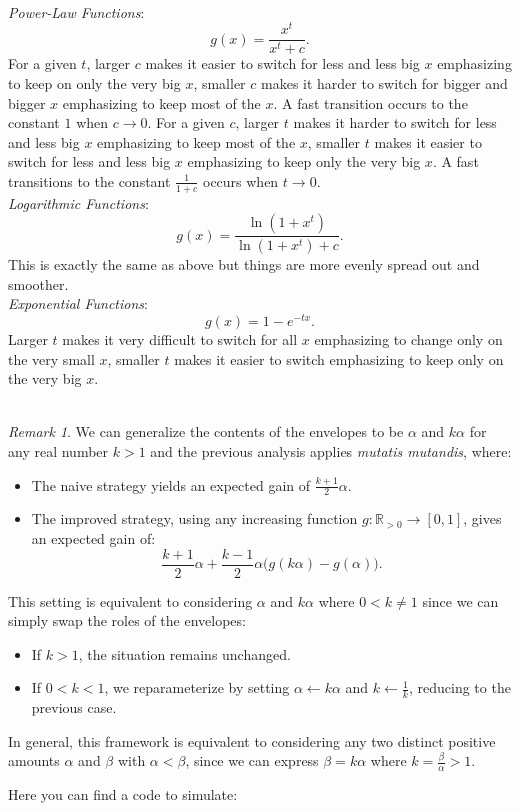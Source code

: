 \documentclass[11pt, a4paper, oneside]{article}
\theoremstyle{remark}
\newtheorem*{remark}{Remark}
\theoremstyle{lemma}
\begin{document}
\\
\textit{Power-Law Functions}:
    \[
    g(x) = \frac{x^t}{x^t + c}.
    \]
For a given $t$, larger \( c \) makes it easier to switch for less and less big \( x\) emphasizing to keep on only the very big $x$, smaller \(c\) makes it harder to switch for bigger and bigger $x$ emphasizing to keep most of the $x$. A fast transition occurs to the constant $1$ when $c\to 0$. For a given $c$, larger $t$ makes it harder to switch for less and less big $x$ emphasizing to keep most of the $x$, smaller $t$ makes it easier to switch for less and less big $x$ emphasizing to keep only the very big $x$. A fast transitions to the constant $\frac{1}{1+c}$ occurs when $t\to 0$. \\
\textit{Logarithmic Functions}:
    \[
    g(x) = \frac{\ln(1 + x^t)}{\ln(1 + x^t) + c}.
    \]
This is exactly the same as above but things are more evenly spread out and smoother. \\
\textit{Exponential Functions}:
    \[
    g(x) = 1 - e^{-t x}.
    \]
Larger \( t \) makes it very difficult to switch for all \( x \) emphasizing to change only on the very small $x$, smaller \(t\) makes it easier to switch emphasizing to keep only on the very big $x$.
\\\\
\begin{remark}
We can generalize the contents of the envelopes to be $\alpha$ and $k\alpha$ for any real number $k > 1$ and the previous analysis applies \textit{mutatis mutandis}, where:
\begin{itemize}
    \item The naive strategy yields an expected gain of $\frac{k+1}{2}\alpha$.
    \item The improved strategy, using any increasing function $g \colon \mathbb{R}_{>0} \to [0,1]$, gives an expected gain of:
    \[
    \frac{k+1}{2}\alpha + \frac{k-1}{2}\alpha\bigl(g(k\alpha) - g(\alpha)\bigr).
    \]
\end{itemize}
This setting is equivalent to considering $\alpha$ and $k\alpha$ where $0 < k \neq 1$ since we can simply swap the roles of the envelopes: 
\begin{itemize}
    \item If $k > 1$, the situation remains unchanged.
    \item If $0 < k < 1$, we reparameterize by setting $\alpha \leftarrow k\alpha$ and $k \leftarrow \frac{1}{k}$, reducing to the previous case.
\end{itemize}
In general, this framework is equivalent to considering any two distinct positive amounts $\alpha$ and $\beta$ with $\alpha < \beta$, since we can express $\beta = k\alpha$ where $k = \frac{\beta}{\alpha} > 1$.
\end{remark}
Here you can find a code to simulate:
\end{document}
